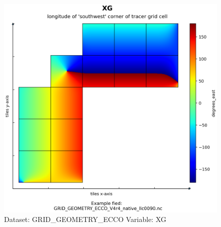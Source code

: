 \begin{figure}[H]
\centering
\includegraphics[scale=0.55]{../images/plots/native_plots_coords/Geometry_Parameters_for_the_Lat-Lon-Cap_90_(llc90)_Native_Model_Grid_(Version_4_Release_4)/XG.png}
\caption{Dataset: GRID\_GEOMETRY\_ECCO Variable: XG}
\label{tab:table-GRID_GEOMETRY_ECCO_XG-Plot}
\end{figure}
\pagebreak
